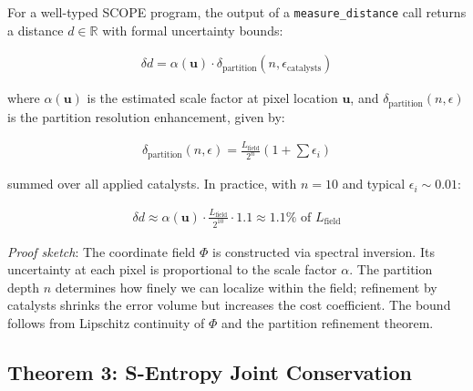 \documentclass[11pt,twocolumn]{article}
\begin{document}
\begin{theorem}
\label{thm:uncertainty}
For a well-typed SCOPE program, the output of a \texttt{measure\_distance} call returns a distance $d \in \mathbb{R}$ with formal uncertainty bounds:

\begin{align}
\delta d = \alpha(\mathbf{u}) \cdot \delta_{\text{partition}}(n, \epsilon_{\text{catalysts}})
\end{align}

\noindent where $\alpha(\mathbf{u})$ is the estimated scale factor at pixel location $\mathbf{u}$, and $\delta_{\text{partition}}(n, \epsilon)$ is the partition resolution enhancement, given by:

\begin{align}
\delta_{\text{partition}}(n, \epsilon) = \frac{L_{\text{field}}}{2^n} \left(1 + \sum \epsilon_i\right)
\end{align}

\noindent summed over all applied catalysts. In practice, with $n = 10$ and typical $\epsilon_i \sim 0.01$:

\begin{align}
\delta d \approx \alpha(\mathbf{u}) \cdot \frac{L_{\text{field}}}{2^{10}} \cdot 1.1 \approx 1.1\% \text{ of } L_{\text{field}}
\end{align}
\end{theorem}

\textit{Proof sketch}: The coordinate field $\Phi$ is constructed via spectral inversion. Its uncertainty at each pixel is proportional to the scale factor $\alpha$. The partition depth $n$ determines how finely we can localize within the field; refinement by catalysts shrinks the error volume but increases the cost coefficient. The bound follows from Lipschitz continuity of $\Phi$ and the partition refinement theorem.

\subsection{Theorem 3: S-Entropy Joint Conservation}
\end{document}

